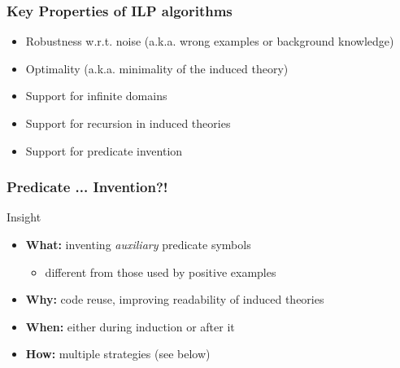 \documentclass[presentation]{beamer}\mode<presentation>{\usetheme{AMSBolognaFC}}
\begin{document}
\begin{frame}%
\frametitle{Key Properties of ILP algorithms}

    \begin{itemize}
        \item \alert{Robustness} w.r.t. noise (a.k.a. wrong examples or background knowledge)
        \bigskip
        \item \alert{Optimality} (a.k.a. minimality of the induced theory)
        \bigskip
        \item Support for \alert{infinite domains}
        \bigskip
        \item Support for \alert{recursion} in induced theories
        \bigskip
        \item Support for \alert{predicate invention}
    \end{itemize}
\end{frame}

\begin{frame}%
\frametitle{Predicate ... Invention?!}
\label{slide:pi}

    \begin{block}{Insight}
        \begin{itemize}
            \item \textbf{What:} inventing \emph{auxiliary} predicate symbols
            \begin{itemize}
                \item different from those used by positive examples
            \end{itemize}
            \item \textbf{Why:} code reuse, improving readability of induced theories
            \item \textbf{When:} either during induction or after it
            \item \textbf{How:} multiple strategies (see below)
        \end{itemize}
    \end{block}

\end{frame}
\end{document}
